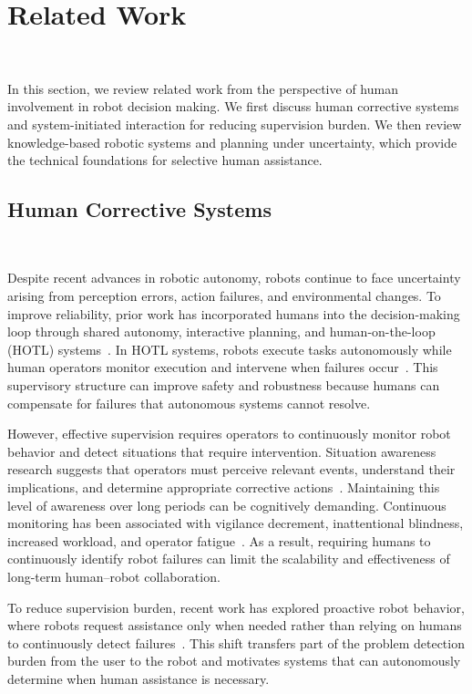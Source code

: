 \section{Related Work}~\label{related}

In this section, we review related work from the perspective of human involvement in robot decision making. We first discuss human corrective systems and system-initiated interaction for reducing supervision burden. We then review knowledge-based robotic systems and planning under uncertainty, which provide the technical foundations for selective human assistance.

\subsection{Human Corrective Systems}~\label{rel:HCS}

Despite recent advances in robotic autonomy, robots continue to face uncertainty arising from perception errors, action failures, and environmental changes. To improve reliability, prior work has incorporated humans into the decision-making loop through shared autonomy, interactive planning, and human-on-the-loop (HOTL) systems~\cite{kelly2019hg,mandlekar2020human}. In HOTL systems, robots execute tasks autonomously while human operators monitor execution and intervene when failures occur~\cite{scharre2015introduction,nahavandi2017trusted}. This supervisory structure can improve safety and robustness because humans can compensate for failures that autonomous systems cannot resolve.

However, effective supervision requires operators to continuously monitor robot behavior and detect situations that require intervention. Situation awareness research suggests that operators must perceive relevant events, understand their implications, and determine appropriate corrective actions~\cite{endsley2018automation}. Maintaining this level of awareness over long periods can be cognitively demanding. Continuous monitoring has been associated with vigilance decrement, inattentional blindness, increased workload, and operator fatigue~\cite{davies1982psychology,davies2013human,mack2003inattentional,wong2017workload}. As a result, requiring humans to continuously identify robot failures can limit the scalability and effectiveness of long-term human--robot collaboration.

To reduce supervision burden, recent work has explored proactive robot behavior, where robots request assistance only when needed rather than relying on humans to continuously detect failures~\cite{baraglia2017efficient}. This shift transfers part of the problem detection burden from the user to the robot and motivates systems that can autonomously determine when human assistance is necessary.

